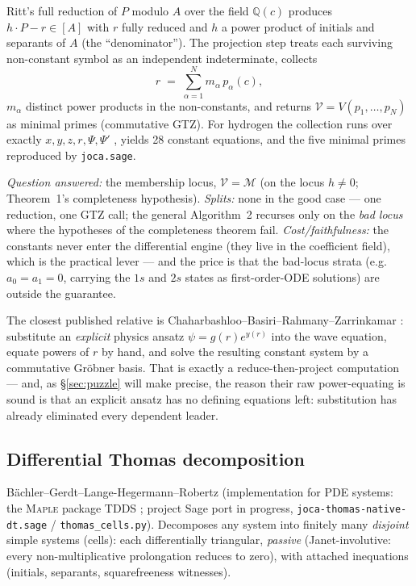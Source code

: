 \documentclass[11pt]{article}
\newcommand{\Psib}{\Psi}
\newcommand{\Var}{\mathcal{V}}
\newcommand{\Mem}{\mathcal{M}}
\newcommand{\code}[1]{\texttt{#1}}
\begin{document}
Ritt's full reduction of $P$ modulo $A$ over the field $\mathbb{Q}(c)$
produces $h\cdot P - r \in [A]$ with $r$ fully reduced and $h$ a power product
of initials and separants of $A$ (the ``denominator''). The projection step
treats each surviving non-constant symbol as an independent indeterminate,
collects
\begin{equation}
\label{eq:collection}
r \;=\; \sum_{\alpha=1}^{N} m_\alpha\,p_\alpha(c),
\end{equation}
$m_\alpha$ distinct power products in the non-constants, and returns
$\Var = V(p_1,\dots,p_N)$ as minimal primes (commutative GTZ). For hydrogen
the collection runs over exactly $x,y,z,r,\Psib,\Psib'$
\cite[\S{}Projection Step]{NewMethod}, yields 28 constant equations, and the
five minimal primes reproduced by \code{joca.sage}.

\emph{Question answered:} the membership locus, $\Var = \Mem$ (on the locus
$h \ne 0$; Theorem~1's completeness hypothesis). \emph{Splits:} none in the
good case --- one reduction, one GTZ call; the general Algorithm~2 recurses
only on the \emph{bad locus} where the hypotheses of the completeness theorem
fail. \emph{Cost/faithfulness:} the constants never enter the differential
engine (they live in the coefficient field), which is the practical lever ---
and the price is that the bad-locus strata (e.g.\ $a_0=a_1=0$, carrying the
$1s$ and $2s$ states as first-order-ODE solutions) are outside the guarantee.

The closest published relative is Chaharbashloo--Basiri--Rahmany--Zarrinkamar
\cite{chaharbashloo}: substitute an \emph{explicit} physics ansatz
$\psi = g(r)e^{y(r)}$ into the wave equation, equate powers of $r$ by hand,
and solve the resulting constant system by a commutative Gr\"obner basis. That
is exactly a reduce-then-project computation --- and, as \S\ref{sec:puzzle}
will make precise, the reason their raw power-equating is sound is that an
explicit ansatz has no defining equations left: substitution has already
eliminated every dependent leader.

\subsection{Differential Thomas decomposition}

B\"achler--Gerdt--Lange-Hegermann--Robertz \cite{BGLR2012} (implementation for
PDE systems: the \textsc{Maple} package TDDS \cite{TDDS}; project Sage port in
progress, \code{joca-thomas-native-dt.sage} / \code{thomas\_cells.py}).
Decomposes any system into finitely many \emph{disjoint} simple systems
(cells): each differentially triangular, \emph{passive} (Janet-involutive:
every non-multiplicative prolongation reduces to zero), with attached
inequations (initials, separants, squarefreeness witnesses).
\end{document}
